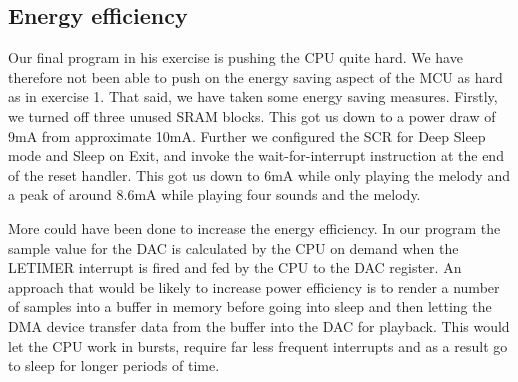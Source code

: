 \subsection{Energy efficiency}

Our final program in his exercise is pushing the CPU quite hard. We have
therefore not been able to push on the energy saving aspect of the MCU as hard
as in exercise 1. That said, we have taken some energy saving measures. Firstly,
we turned off three unused SRAM blocks. This got us down to a power draw of 9mA
from approximate 10mA. Further we configured the SCR for Deep Sleep mode and
Sleep on Exit, and invoke the wait-for-interrupt instruction at the end of the
reset handler. This got us down to 6mA while only playing the melody and a peak
of around 8.6mA while playing four sounds and the melody.

More could have been done to increase the energy efficiency. In our program the
sample value for the DAC is calculated by the CPU on demand when the LETIMER
interrupt is fired and fed by the CPU to the DAC register. An approach that
would be likely to increase power efficiency is to render a number of samples
into a buffer in memory before going into sleep and then letting the DMA device
transfer data from the buffer into the DAC for playback. This would let the CPU
work in bursts, require far less frequent interrupts and as a result go to sleep
for longer periods of time.
